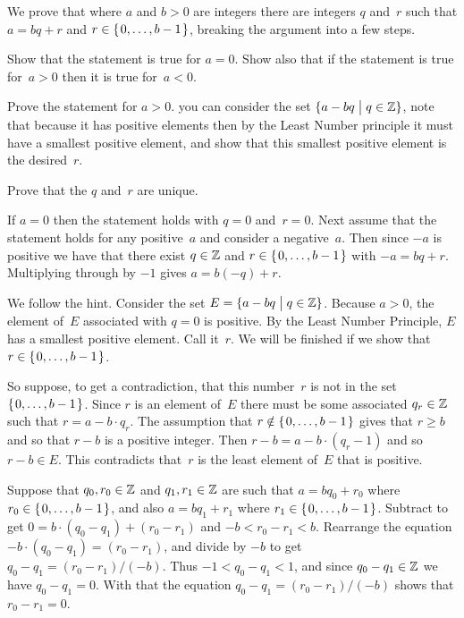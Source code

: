\documentclass{ibl}
\begin{document}
\begin{ex}  We prove that 
where $a$ and $b>0$ are integers there are integers $q$ and~$r$
such that $a=bq+r$ and $r\in\mbox{$\{\hspace{0.1em}0,\ldots,b-1\hspace{0.1em}\}$}$,
breaking the argument into a few steps.
\begin{exes} 
\item Show that the statement is true for $a=0$.
  Show also that if the statement is true for~$a>0$ then it is true
  for~$a<0$. 
\item Prove the statement for $a>0$.
  \hint you can consider the set $\{a-bq \bigm| q\in\mathbb{Z}\}$, note that
  because it has positive elements then by the Least Number principle
  it must have a smallest positive
  element, and show that this smallest positive element is the desired~$r$.
\item
  Prove that the $q$ and~$r$ are unique.
\end{exes}
\begin{ans}
\begin{exes}
\item
  If $a=0$ then the statement holds with $q=0$ and~$r=0$.
  Next assume that the statement holds for any positive~$a$ 
  and consider a negative~$a$.
  Then since $-a$ is positive we have that there exist 
  $q\in\mathbb{Z}$ and $r\in\mbox{$\{\hspace{0.1em}0,\ldots,b-1\hspace{0.1em}\}$}$ with $-a=bq+r$.
  Multiplying through by $-1$ gives $a=b(-q)+r$.
\item We follow the hint.
  Consider the set $E=\{a-bq \bigm| q\in\mathbb{Z}\}$.
  Because $a>0$, the element of~$E$ associated with $q=0$ is positive.
  By the Least Number Principle, $E$ has a smallest positive element.
  Call it~$r$.
  We will be finished if we show that~$r\in\mbox{$\{\hspace{0.1em}0, \ldots , b-1\hspace{0.1em}\}$}$.

  So suppose, to get a contradiction, that this number~$r$ is not in the set 
  $\mbox{$\{\hspace{0.1em}0, \ldots , b-1\hspace{0.1em}\}$}$.
  Since $r$ is an element of~$E$ there must be some associated
  $q_r\in\mathbb{Z}$ such that $r=a-b\cdot q_r$.
  The assumption that $r\notin\mbox{$\{\hspace{0.1em}0, \ldots , b-1\hspace{0.1em}\}$}$ gives that $r\geq b$
  and so that $r-b$ is a positive integer.
  Then $r-b=a-b\cdot (q_r-1)$ and so $r-b\in E$.
  This contradicts that~$r$ is the least element of~$E$ that is positive.
\item Suppose that $q_0,r_0\in\mathbb{Z}$ and $q_1,r_1\in\mathbb{Z}$ are such that
  $a=bq_0+r_0$ where $r_0\in\mbox{$\{\hspace{0.1em}0, \ldots, b-1\hspace{0.1em}\}$}$, and also
  $a=bq_1+r_1$ where $r_1\in\mbox{$\{\hspace{0.1em}0, \ldots, b-1\hspace{0.1em}\}$}$.
  Subtract to get $0=b\cdot(q_0-q_1)+(r_0-r_1)$ and $-b<r_0-r_1<b$.
  Rearrange the equation $-b\cdot(q_0-q_1)=(r_0-r_1)$,
  and divide by $-b$ to get $q_0-q_1=(r_0-r_1)/(-b)$.
  Thus  $-1<q_0-q_1<1$, and since $q_0-q_1\in\mathbb{Z}$ we have $q_0-q_1=0$.
  With that the equation $q_0-q_1=(r_0-r_1)/(-b)$ shows that $r_0-r_1=0$.
\end{exes}
\end{ans}
\end{ex}
\end{document}
